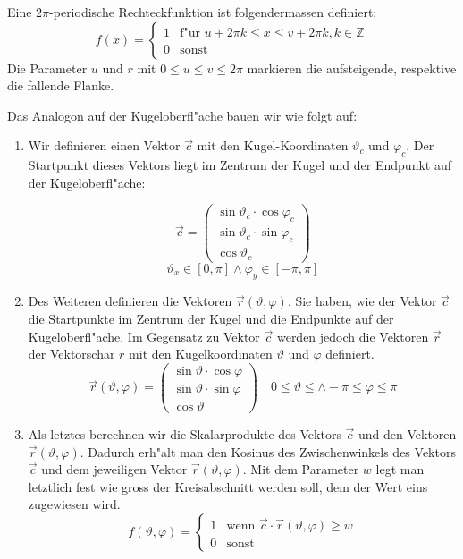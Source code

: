 \begin{refsection}
Eine $2\pi$-periodische Rechteckfunktion ist folgendermassen definiert:
\begin{equation}
f(x) =
\begin{cases}
1 & \text{f"ur } u+2\pi k \leq x \leq v + 2\pi k , k \in \mathbb{Z}
\\
0 & \text{sonst } 
\end{cases}
\label{skript:Rechteckfunktion Formel}
\end{equation}
Die Parameter $u$ und $r$ mit $0 \leq u \leq v \leq 2\pi$ markieren
die aufsteigende, respektive die fallende Flanke. 

Das Analogon auf der Kugeloberfl"ache bauen wir wie folgt auf:
\begin{enumerate}
\item Wir definieren einen Vektor $\vec{c}$ mit den Kugel-Koordinaten
$\vartheta_c$ und $\varphi_c$.
Der Startpunkt dieses Vektors liegt im Zentrum der Kugel und der
Endpunkt auf der Kugeloberfl"ache:

\begin{equation}
\vec{c} = 
\begin{pmatrix}
{\sin\vartheta_c \cdot \cos\varphi_c}\\
{\sin\vartheta_c \cdot \sin\varphi_c}\\
{\cos\vartheta_c}
\end{pmatrix}
\label{skript:Vektor c Formel}
\end{equation}
$$
\vartheta_x \in [ 0, \pi ] \wedge \varphi_y \in [ -\pi, \pi ]
$$

\item Des Weiteren definieren die Vektoren $\vec{r} (\vartheta, \varphi)$.
Sie haben, wie der Vektor $\vec{c}$ die Startpunkte im Zentrum der 
Kugel und die Endpunkte auf der Kugeloberfl"ache. 
Im Gegensatz zu Vektor $\vec{c}$ werden jedoch die Vektoren  
$\vec{r}$ der Vektorschar $r$ mit den Kugelkoordinaten
$\vartheta$ und $\varphi$ definiert.
\[
\vec{r} (\vartheta, \varphi) = 
\begin{pmatrix}
{\sin\vartheta \cdot \cos\varphi}\\
{\sin\vartheta \cdot \sin\varphi}\\
{\cos\vartheta}
\end{pmatrix}
\quad
0 \leq \vartheta \leq \wedge -\pi \leq \varphi \leq \pi
\]

\item Als letztes berechnen wir die Skalarprodukte des Vektors $\vec{c}$
und den Vektoren $\vec{r} (\vartheta, \varphi)$.
Dadurch erh"alt man den Kosinus des Zwischenwinkels des Vektors $\vec{c}$
und dem jeweiligen Vektor $\vec{r} (\vartheta, \varphi)$.
Mit dem Parameter $w$ legt man letztlich fest wie gross der 
Kreisabschnitt werden soll, dem der Wert eins zugewiesen wird.
\begin{equation}
f(\vartheta, \varphi) =\begin{cases}
1 & \text{wenn } \vec{c} \cdot \vec{r} (\vartheta, \varphi) \geq w\\
0 & \text{sonst}
\end{cases}
\label{skript:Kugelfunktion Formel}
\end{equation}
\end{enumerate}

\end{refsection}
